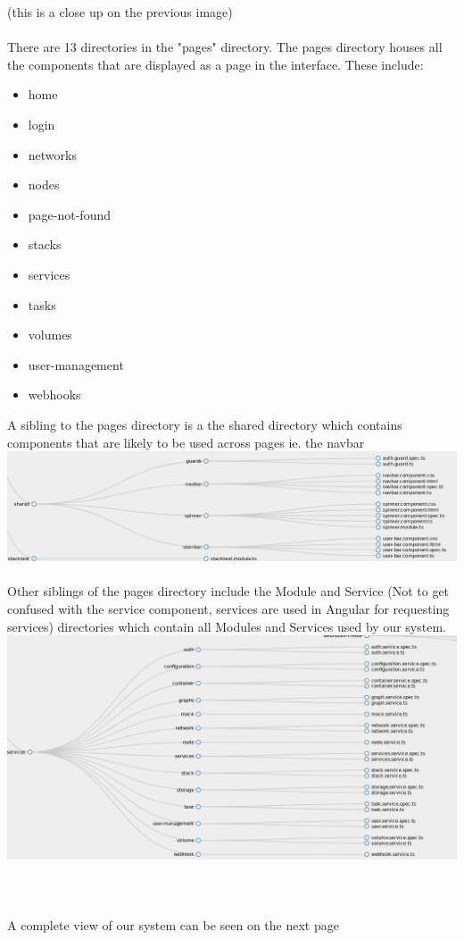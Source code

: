 \documentclass[a4paper]{article}
\begin{document}
(this is a close up on the previous image)\\\\
There are 13 directories in the "pages" directory. The pages directory houses all the components that are 
displayed as a page in the interface. These include:
\begin{itemize} 
    \item home 
    \item login
    \item networks
    \item nodes
    \item page-not-found
    \item stacks
    \item services
    \item tasks
    \item volumes
    \item user-management
    \item webhooks
\end{itemize}
\pagebreak
A sibling to the pages directory is a the shared directory which contains components that are likely to be 
used across pages ie. the navbar\\
\includegraphics[scale=0.4]{shared.png}\\\\
Other siblings of the pages directory include the Module and Service (Not to get confused with the service component, 
services are used in Angular for requesting services) 
directories which contain all Modules and Services used by our system.\\
\includegraphics[scale=0.4]{service.png}\\\\\\\\
A complete view of our system can be seen on the next page\\ 
\end{document}
